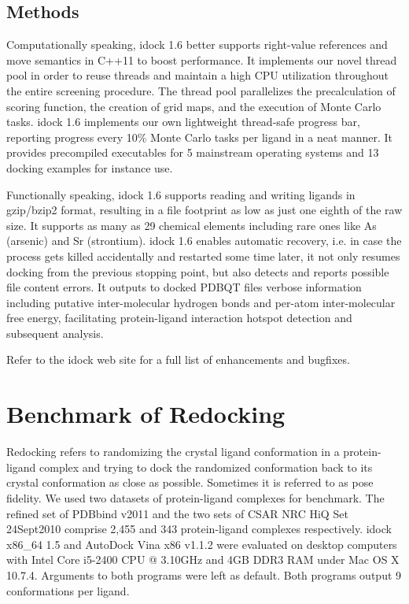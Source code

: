 \documentclass{bioinfo}
\begin{document}
\begin{methods}
\section{Methods}

Computationally speaking, idock 1.6 better supports right-value references and move semantics in C++11 to boost performance. It implements our novel thread pool in order to reuse threads and maintain a high CPU utilization throughout the entire screening procedure. The thread pool parallelizes the precalculation of scoring function, the creation of grid maps, and the execution of Monte Carlo tasks. idock 1.6 implements our own lightweight thread-safe progress bar, reporting progress every 10\% Monte Carlo tasks per ligand in a neat manner. It provides precompiled executables for 5 mainstream operating systems and 13 docking examples for instance use.

Functionally speaking, idock 1.6 supports reading and writing ligands in gzip/bzip2 format, resulting in a file footprint as low as just one eighth of the raw size. It supports as many as 29 chemical elements including rare ones like As (arsenic) and Sr (strontium). idock 1.6 enables automatic recovery, i.e. in case the process gets killed accidentally and restarted some time later, it not only resumes docking from the previous stopping point, but also detects and reports possible file content errors. It outputs to docked PDBQT files verbose information including putative inter-molecular hydrogen bonds and per-atom inter-molecular free energy, facilitating protein-ligand interaction hotspot detection and subsequent analysis.

Refer to the idock web site for a full list of enhancements and bugfixes.

\end{methods}

\section{Benchmark of Redocking}

Redocking refers to randomizing the crystal ligand conformation in a protein-ligand complex and trying to dock the randomized conformation back to its crystal conformation as close as possible. Sometimes it is referred to as pose fidelity. We used two datasets of protein-ligand complexes for benchmark. The refined set of PDBbind v2011 \citep{530} and the two sets of CSAR NRC HiQ Set 24Sept2010 \citep{857} comprise 2,455 and 343 protein-ligand complexes respectively. idock x86\_64 1.5 and AutoDock Vina x86 v1.1.2 were evaluated on desktop computers with Intel Core i5-2400 CPU @ 3.10GHz and 4GB DDR3 RAM under Mac OS X 10.7.4. Arguments to both programs were left as default. Both programs output 9 conformations per ligand.
\end{document}
